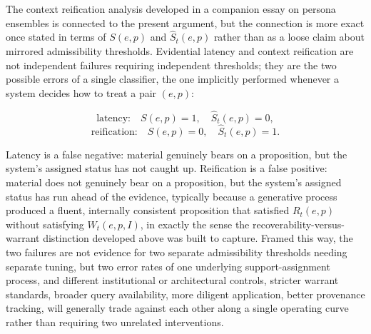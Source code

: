 \documentclass[11pt]{article}
\begin{document}
The context reification analysis developed in a companion essay on persona ensembles is connected to the present argument, but the connection is more exact once stated in terms of $S(e,p)$ and $\widehat S_t(e,p)$ rather than as a loose claim about mirrored admissibility thresholds. Evidential latency and context reification are not independent failures requiring independent thresholds; they are the two possible errors of a single classifier, the one implicitly performed whenever a system decides how to treat a pair $(e,p)$:

\[
\text{latency:} \quad S(e,p) = 1, \quad \widehat S_t(e,p) = 0,
\]
\[
\text{reification:} \quad S(e,p) = 0, \quad \widehat S_t(e,p) = 1.
\]

Latency is a false negative: material genuinely bears on a proposition, but the system's assigned status has not caught up. Reification is a false positive: material does not genuinely bear on a proposition, but the system's assigned status has run ahead of the evidence, typically because a generative process produced a fluent, internally consistent proposition that satisfied $R_t(e,p)$ without satisfying $W_t(e,p,I)$, in exactly the sense the recoverability-versus-warrant distinction developed above was built to capture. Framed this way, the two failures are not evidence for two separate admissibility thresholds needing separate tuning, but two error rates of one underlying support-assignment process, and different institutional or architectural controls, stricter warrant standards, broader query availability, more diligent application, better provenance tracking, will generally trade against each other along a single operating curve rather than requiring two unrelated interventions.
\end{document}
